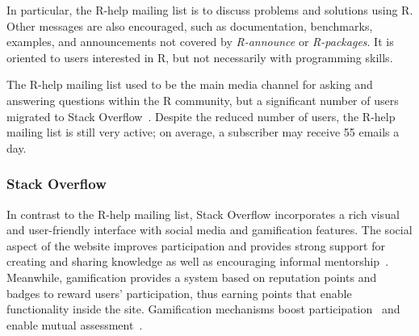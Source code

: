 In particular, the R-help mailing list is to discuss problems and solutions using R. 
Other messages are also encouraged, such as documentation, benchmarks, examples, and announcements not covered by \emph{R-announce} or \emph{R-packages}.
It is oriented to users interested in R, but not necessarily with programming skills.

    The R-help mailing list used to be the main media channel for asking and answering questions within the R community, but a significant number of users migrated to Stack Overflow~\cite{Vasilescu2014c}.
    Despite the reduced number of users, the R-help mailing list is still very active; on average, a subscriber may receive 55 emails a day.

\subsubsection{Stack Overflow}
\label{subsec:Rtag}

    In contrast to the R-help mailing list, Stack Overflow incorporates a rich visual and user-friendly interface with social media and gamification features.
    The social aspect of the website improves participation and provides strong support for creating and sharing knowledge as well as encouraging informal mentorship~\cite{Jenkins2009, Storey2014}.
    Meanwhile, gamification provides a system based on reputation points and badges to reward users' participation, thus earning points that enable functionality inside the site.
    Gamification mechanisms boost participation~\cite{Vasilescu2014} and enable mutual assessment~\cite{Singer2013}.


